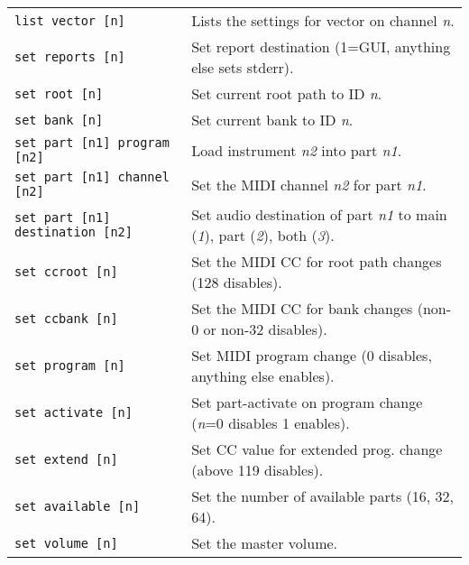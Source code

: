 \begin{table}[H]
\begin{tabular}{l l}
         \texttt{list vector [n]} &
            Lists the settings for vector on channel \textsl{n}. \\

         \texttt{set reports [n]} &
            Set report destination (1=GUI, anything else sets stderr). \\

         \texttt{set root [n]} &
            Set current root path to ID \textsl{n}. \\

         \texttt{set bank [n]} &
            Set current bank to ID \textsl{n}. \\

         \texttt{set part [n1] program [n2]} &
            Load instrument \textsl{n2} into part \textsl{n1}. \\

         \texttt{set part [n1] channel [n2]} &
            Set the MIDI channel \textsl{n2} for part \textsl{n1}. \\

         \texttt{set part [n1] destination [n2]} &
            Set audio destination of part \textsl{n1}
            to main (\textsl{1}), part (\textsl{2}), both (\textsl{3}). \\

         \texttt{set ccroot [n]} &
            Set the MIDI CC for root path changes (128 disables). \\

         \texttt{set ccbank [n]} &
            Set the MIDI CC for bank changes (non-0 or non-32 disables). \\

         \texttt{set program [n]} &
            Set MIDI program change (0 disables, anything else enables). \\

         \texttt{set activate [n]} &
            Set part-activate on program change (\textsl{n}=0 disables
            1 enables). \\

         \texttt{set extend [n]} &
            Set CC value for extended prog. change (above 119 disables). \\

         \texttt{set available [n]} &
            Set the number of available parts (16, 32, 64). \\

         \texttt{set volume [n]} &
            Set the master volume. \\


\end{tabular}
\end{table}
